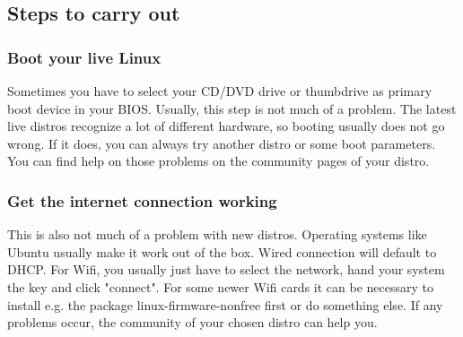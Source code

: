 \documentclass[12pt,a4paper]{article}
\begin{document}
\subsection{Steps to carry out}
\subsubsection{Boot your live Linux}
Sometimes you have to select your CD/DVD drive or thumbdrive as primary boot device in your BIOS. Usually, this step is not much of a problem. The latest live distros recognize a lot of different hardware, so booting usually does not go wrong. If it does, you can always try another distro or some boot parameters. You can find help on those problems on the community pages of your distro.

\subsubsection{Get the internet connection working}
This is also not much of a problem with new distros. Operating systems like Ubuntu usually make it work out of the box. Wired connection will default to DHCP. For Wifi, you usually just have to select the network, hand your system the key and click "connect". For some newer Wifi cards it can be necessary to install e.g. the package linux-firmware-nonfree first or do something else. If any problems occur, the community of your chosen distro can help you.
\end{document}
